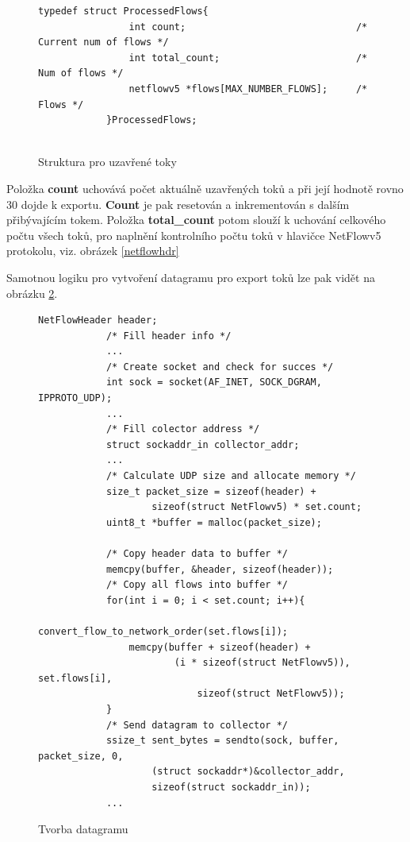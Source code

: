 \documentclass[11pt, a4paper, hidelinks]{article}[08.10.2023]
\begin{document}
     \begin{figure}[H]
        \centering
        \begin{lstlisting}[style=CStyle]
            typedef struct ProcessedFlows{
                int count;                              /* Current num of flows */
                int total_count;                        /* Num of flows */
                netflowv5 *flows[MAX_NUMBER_FLOWS];     /* Flows */
            }ProcessedFlows;
            
        \end{lstlisting}
        \caption{Struktura pro uzavřené toky}
        \label{set}
    \end{figure}

    Položka \textbf{count} uchovává počet aktuálně uzavřených toků a při její hodnotě rovno 30 dojde k exportu. \textbf{Count} je pak resetován a inkrementován s dalším přibývajícím tokem. Položka \textbf{total\_count} potom slouží k uchování celkového počtu všech toků, pro naplnění kontrolního počtu toků v hlavičce NetFlowv5 protokolu, viz. obrázek \ref{netflowhdr}

    Samotnou logiku pro vytvoření datagramu pro export toků lze pak vidět na obrázku \ref{export_udp}.
         \begin{figure}[H]
        \centering
        \begin{lstlisting}[style=CStyle]
            NetFlowHeader header;
            /* Fill header info */
            ...
            /* Create socket and check for succes */
            int sock = socket(AF_INET, SOCK_DGRAM, IPPROTO_UDP);
            ...
            /* Fill colector address */
            struct sockaddr_in collector_addr;
            ...
            /* Calculate UDP size and allocate memory */
            size_t packet_size = sizeof(header) + 
                    sizeof(struct NetFlowv5) * set.count;
            uint8_t *buffer = malloc(packet_size);

            /* Copy header data to buffer */
            memcpy(buffer, &header, sizeof(header));
            /* Copy all flows into buffer */
            for(int i = 0; i < set.count; i++){
                convert_flow_to_network_order(set.flows[i]);
                memcpy(buffer + sizeof(header) + 
                        (i * sizeof(struct NetFlowv5)), set.flows[i], 
                            sizeof(struct NetFlowv5));
            }
            /* Send datagram to collector */
            ssize_t sent_bytes = sendto(sock, buffer, packet_size, 0, 
                    (struct sockaddr*)&collector_addr, 
                    sizeof(struct sockaddr_in));
            ...
        \end{lstlisting}
        \caption{Tvorba datagramu}
        \label{export_udp}
    \end{figure}
\end{document}
